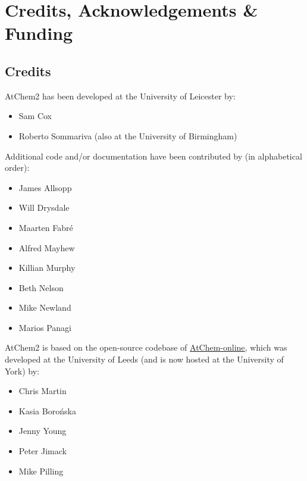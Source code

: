 %
%
%
%

\chapter{Credits, Acknowledgements \& Funding} \label{ch:credits}

\setlength{\parindent}{0pt}

\section{Credits} \label{sec:credits}

AtChem2 has been developed at the University of Leicester by:

\begin{itemize}
\item Sam Cox
\item Roberto Sommariva (also at the University of Birmingham)
\end{itemize}

Additional code and/or documentation have been contributed by (in alphabetical order):

\begin{itemize}
\item James Allsopp
\item Will Drysdale
\item Maarten Fabr{\'e}
\item Alfred Mayhew
\item Killian Murphy
\item Beth Nelson
\item Mike Newland
\item Marios Panagi
\end{itemize}

AtChem2 is based on the open-source codebase of \href{https://atchem.york.ac.uk}{AtChem-online},
which was developed at the University of Leeds (and is now hosted at the University of York) by:

\begin{itemize}
\item Chris Martin
\item Kasia Boro{\'n}ska
\item Jenny Young
\item Peter Jimack
\item Mike Pilling
\end{itemize}

